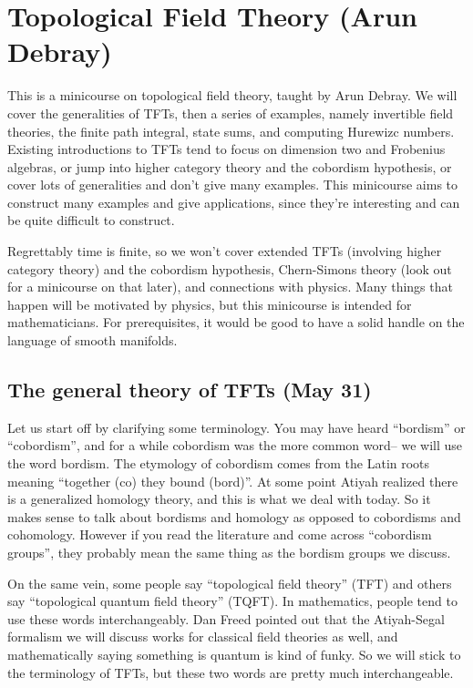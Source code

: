 \section{Topological Field Theory (Arun Debray)} 

This is a minicourse on topological field theory, taught by Arun Debray. We will cover the generalities of TFTs, then a series of examples, namely invertible field theories, the finite path integral, state sums, and computing Hurewizc numbers. Existing introductions to TFTs tend to focus on dimension two and Frobenius algebras, or jump into higher category theory and the cobordism hypothesis, or cover lots of generalities and don't give many examples. This minicourse aims to construct many examples and give applications, since they're interesting and can be quite difficult to construct.

Regrettably time is finite, so we won't cover extended TFTs (involving higher category theory) and the cobordism hypothesis, Chern-Simons theory (look out for a minicourse on that later), and connections with physics. Many things that happen will be motivated by physics, but this minicourse is intended for mathematicians. For prerequisites, it would be good to have a solid handle on the language of smooth manifolds.

\subsection{The general theory of TFTs (May 31)}
Let us start off by clarifying some terminology. You may have heard ``bordism'' or ``cobordism'', and for a while cobordism was the more common word-- we will use the word bordism. The etymology of cobordism comes from the Latin roots meaning ``together (co) they bound (bord)''. At some point Atiyah realized there is a generalized homology theory, and this is what we deal with today. So it makes sense to talk about bordisms and homology as opposed to cobordisms and cohomology. However if you read the literature and come across ``cobordism groups'', they probably mean the same thing as the bordism groups we discuss.

On the same vein, some people say ``topological field theory'' (TFT) and others say ``topological quantum field theory'' (TQFT). In mathematics, people tend to use these words interchangeably. Dan Freed pointed out that the Atiyah-Segal formalism we will discuss works for classical field theories as well, and mathematically saying something is quantum is kind of funky. So we will stick to the terminology of TFTs, but these two words are pretty much interchangeable.

